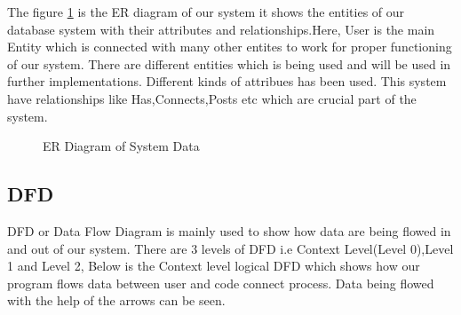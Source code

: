 The figure \ref{ER} is the ER diagram of our system it shows the entities of our database system with their attributes and relationships.Here, User is the main Entity which is connected with many other entites to work for proper functioning of our system. There are different entities which is being used and will be used in further implementations. Different kinds of attribues has been used. This system have relationships like Has,Connects,Posts etc which are crucial part of the system.
\begin{figure}[H]
    \caption{ER Diagram of System Data}
    \label{ER}
\end{figure}
\newpage
\subsection{DFD}
DFD or Data Flow Diagram is mainly used to show how data are being flowed in and out of our system. There are 3 levels of DFD i.e Context Level(Level 0),Level 1 and Level 2, Below is the Context level logical DFD which shows how our program flows data between user and code connect process. Data being flowed with the help of the arrows can be seen.

